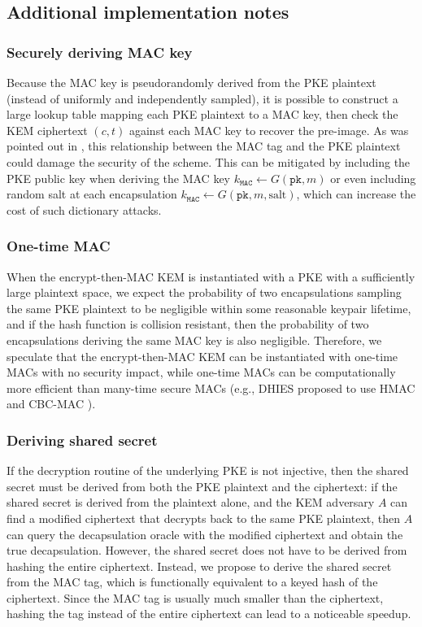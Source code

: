 \documentclass[runningheads]{llncs}
\newcommand{\mac}{\texttt{MAC}}
\newcommand{\pk}{\texttt{pk}}
\begin{document}
\subsection{Additional implementation notes}\label{sec:discussion-on-real-world-attacks}
\subsubsection{Securely deriving MAC key} Because the MAC key is pseudorandomly derived from the PKE plaintext (instead of uniformly and independently sampled), it is possible to construct a large lookup table mapping each PKE plaintext to a MAC key, then check the KEM ciphertext $(c, t)$ against each MAC key to recover the pre-image. As was pointed out in \cite{DBLP:journals/iacr/Bernstein21,cryptoeprint:2021/912}, this relationship between the MAC tag and the PKE plaintext could damage the security of the scheme. This can be mitigated by including the PKE public key when deriving the MAC key $k_\mac \leftarrow G(\pk, m)$ or even including random salt at each encapsulation $k_\mac \leftarrow G(\pk, m, \text{salt})$, which can increase the cost of such dictionary attacks.

\subsubsection{One-time MAC} When the encrypt-then-MAC KEM is instantiated with a PKE with a sufficiently large plaintext space, we expect the probability of two encapsulations sampling the same PKE plaintext to be negligible within some reasonable keypair lifetime, and if the hash function is collision resistant, then the probability of two encapsulations deriving the same MAC key is also negligible. Therefore, we speculate that the encrypt-then-MAC KEM can be instantiated with one-time MACs \cite{DBLP:journals/jcss/CarterW79} with no security impact, while one-time MACs can be computationally more efficient than many-time secure MACs (e.g., DHIES proposed to use HMAC and CBC-MAC \cite{DBLP:conf/ctrsa/AbdallaBR01}).

\subsubsection{Deriving shared secret} If the decryption routine of the underlying PKE is not injective, then the shared secret must be derived from both the PKE plaintext and the ciphertext: if the shared secret is derived from the plaintext alone, and the KEM adversary $A$ can find a modified ciphertext that decrypts back to the same PKE plaintext, then $A$ can query the decapsulation oracle with the modified ciphertext and obtain the true decapsulation. However, the shared secret does not have to be derived from hashing the entire ciphertext. Instead, we propose to derive the shared secret from the MAC tag, which is functionally equivalent to a keyed hash of the ciphertext. Since the MAC tag is usually much smaller than the ciphertext, hashing the tag instead of the entire ciphertext can lead to a noticeable  speedup.
\end{document}
